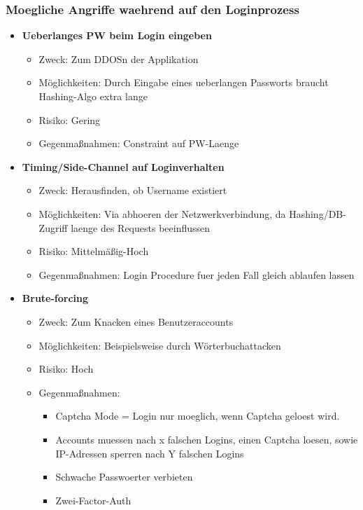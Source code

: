 \documentclass[12pt,DIV14,BCOR10mm,a4paper,twoside,parskip=half-,headsepline,headinclude,english,ngerman,bibliography=totocnumbered]{scrreprt}
\begin{document}
\subsubsection{Moegliche Angriffe waehrend auf den Loginprozess}

\begin{itemize}
  \item \textbf{Ueberlanges PW beim Login eingeben}
  \begin{itemize}
  \item Zweck: Zum DDOSn der Applikation
  \item Möglichkeiten: Durch Eingabe eines ueberlangen Passworts braucht Hashing-Algo extra lange
  \item Risiko: Gering
  \item Gegenmaßnahmen: Constraint auf PW-Laenge
  \end{itemize}

  \item \textbf{Timing/Side-Channel auf Loginverhalten}
  \begin{itemize}
  \item Zweck: Herausfinden, ob Username existiert
  \item Möglichkeiten: Via abhoeren der Netzwerkverbindung, da Hashing/DB-Zugriff laenge des Requests beeinflussen
  \item Risiko: Mittelmäßig-Hoch
  \item Gegenmaßnahmen: Login Procedure fuer jeden Fall gleich ablaufen lassen
  \end{itemize}

  \item \textbf{Brute-forcing}
  \begin{itemize}
  \item Zweck: Zum Knacken eines Benutzeraccounts
  \item Möglichkeiten: Beispielsweise durch Wörterbuchattacken
  \item Risiko: Hoch
  \item Gegenmaßnahmen:
  \begin{itemize}
      \item Captcha Mode = Login nur moeglich, wenn Captcha geloest wird.
      \item Accounts muessen nach x falschen Logins, einen Captcha loesen, sowie IP-Adressen sperren nach Y falschen Logins
      \item Schwache Passwoerter verbieten
      \item Zwei-Factor-Auth
    \end{itemize}
  \end{itemize}
\end{itemize}
\end{document}
